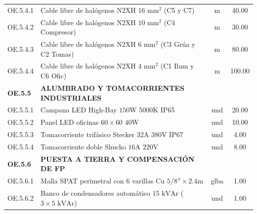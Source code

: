 \begin{table}[H]
\begin{tabular}{llcc}
OE.5.4.1 & Cable libre de halógenos N2XH $16\text{ mm}^2$ (C5 y C7) & m & 40.00 \\
OE.5.4.2 & Cable libre de halógenos N2XH $10\text{ mm}^2$ (C4 Compresor) & m & 30.00 \\
OE.5.4.3 & Cable libre de halógenos N2XH $6\text{ mm}^2$ (C3 Grúa y C2 Tomas) & m & 80.00 \\
OE.5.4.4 & Cable libre de halógenos N2XH $4\text{ mm}^2$ (C1 Ilum y C6 Ofic) & m & 100.00 \\
\midrule
\textbf{OE.5.5} & \textbf{ALUMBRADO Y TOMACORRIENTES INDUSTRIALES} & & \\
OE.5.5.1 & Campana LED High-Bay $150\text{W}$ 5000K IP65 & und & 20.00 \\
OE.5.5.2 & Panel LED oficinas $60 \times 60$ $40\text{W}$ & und & 10.00 \\
OE.5.5.3 & Tomacorriente trifásico Stecker $32\text{A}$ $380\text{V}$ IP67 & und & 4.00 \\
OE.5.5.4 & Tomacorriente doble Shucko $16\text{A}$ $220\text{V}$ & und & 8.00 \\
\midrule
\textbf{OE.5.6} & \textbf{PUESTA A TIERRA Y COMPENSACIÓN DE FP} & & \\
OE.5.6.1 & Malla SPAT perimetral con 6 varillas Cu $5/8'' \times 2.4\text{m}$ & glba & 1.00 \\
OE.5.6.2 & Banco de condensadores automático $15\text{ kVAr}$ ($3 \times 5\text{ kVAr}$) & und & 1.00 \\
\bottomrule
\end{tabular}
\end{table}
